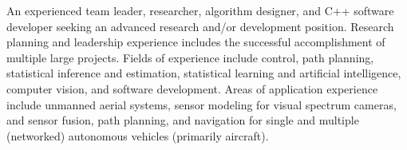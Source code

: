 An experienced team leader, researcher, algorithm designer, and C++ software developer seeking an advanced research and/or development position. Research planning and leadership experience includes the successful accomplishment of multiple large projects. Fields of experience include control, path planning, statistical inference and estimation, statistical learning and artificial intelligence, computer vision, and software development. Areas of application experience include unmanned aerial systems, sensor modeling for visual spectrum cameras, and sensor fusion, path planning, and navigation for single and multiple (networked) autonomous vehicles (primarily aircraft).
